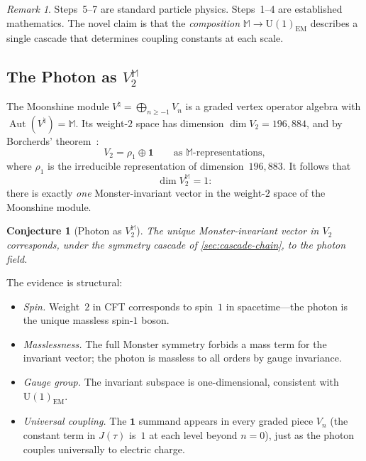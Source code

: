 \documentclass[11pt,a4paper]{article}
\theoremstyle{plain}
\newtheorem{conjecture}[theorem]{Conjecture}
\theoremstyle{remark}
\newtheorem{remark}[theorem]{Remark}
\newcommand{\Aut}{\operatorname{Aut}}
\begin{document}
\begin{remark}
Steps~5--7 are standard particle physics.  Steps~1--4 are established
mathematics.  The novel claim is that the \emph{composition}
$\mathbb{M}\to\mathrm{U}(1)_{\mathrm{EM}}$ describes a single cascade
that determines coupling constants at each scale.
\end{remark}

\subsection{The Photon as $V_2^{\mathbb{M}}$}
\label{sec:cascade-photon}

The Moonshine module $V^\natural = \bigoplus_{n\geq -1} V_n$ is a graded
vertex operator algebra with $\Aut(V^\natural)=\mathbb{M}$.
Its weight-$2$ space has dimension $\dim V_2 = 196{,}884$, and by
Borcherds' theorem~\cite{borcherds1992}:
\[
  V_2 = \rho_1\oplus\mathbf{1}
  \qquad\text{as $\mathbb{M}$-representations},
\]
where $\rho_1$ is the irreducible representation of
dimension~$196{,}883$.  It follows that
\[
  \dim V_2^{\mathbb{M}} = 1:
\]
there is exactly \emph{one} Monster-invariant vector in the weight-$2$
space of the Moonshine module.

\begin{conjecture}[Photon as $V_2^{\mathbb{M}}$]
\label{conj:photon}
The unique Monster-invariant vector in $V_2$ corresponds, under the
symmetry cascade of \cref{sec:cascade-chain}, to the photon field.
\end{conjecture}

The evidence is structural:
\begin{itemize}[itemsep=3pt]
\item \emph{Spin.}  Weight~$2$ in CFT corresponds to spin~$1$ in
  spacetime---the photon is the unique massless spin-$1$ boson.
\item \emph{Masslessness.}  The full Monster symmetry forbids a mass
  term for the invariant vector; the photon is massless to all orders
  by gauge invariance.
\item \emph{Gauge group.}  The invariant subspace is one-dimensional,
  consistent with $\mathrm{U}(1)_{\mathrm{EM}}$.
\item \emph{Universal coupling.}  The $\mathbf{1}$ summand appears in
  every graded piece $V_n$ (the constant term in $J(\tau)$ is~$1$ at
  each level beyond $n=0$), just as the photon couples universally to
  electric charge.
\end{itemize}
\end{document}
